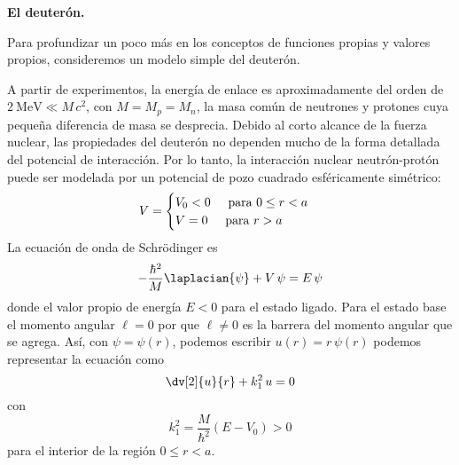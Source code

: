 \begin{ejemplo}{\textbf{El deuterón.}}
    
Para profundizar un poco más en los conceptos de funciones propias y valores propios, consideremos un modelo simple del deuterón.
\par
A partir de experimentos, la energía de enlace es aproximadamente del orden de $\SI{2}{\mega \electronvolt} \ll M \, c^{2} $, con $M = M_{p} = M_{n}$, la masa común de neutrones y protones cuya pequeña diferencia de masa se desprecia. Debido al corto alcance de la fuerza nuclear, las propiedades del deuterón no dependen mucho de la forma detallada del potencial de interacción. Por lo tanto, la interacción nuclear neutrón-protón puede ser modelada por un potencial de pozo cuadrado esféricamente simétrico: 
\begin{equation}
V = \begin{cases}
V_{0} < 0 \hspace{0.5cm} \text{para } 0 \leq r < a \\
V = 0 \hspace{0.5cm} \text{para } r > a
\end{cases}
\end{equation}
La ecuación de onda de Schrödinger es
\begin{equation}
- \dfrac{\hbar^{2}}{M} \laplacian{\psi} + V \, \psi =  E \, \psi
\label{eq:ecuacion_10_10}
\end{equation}
donde el valor propio de energía $E < 0$ para el estado ligado. Para el estado base el momento angular $ \ell = 0$ por que $\ell \neq 0$ es la barrera del momento angular que se agrega. Así, con $\psi =  \psi(r)$, podemos escribir $u(r) = r \, \psi (r)$ podemos representar la ecuación como
\begin{equation}
\dv[2]{u}{r} + k_{1}^{2} \, u = 0
\label{eq:ecuacion_10_11}
\end{equation}
con
\begin{equation}
k_{1}^{2} =  \dfrac{M}{\hbar^{2}} (E - V_{0}) > 0
\label{eq:ecuacion_10_12}
\end{equation}
para el interior de la región $0 \leq r < a$. %

\end{ejemplo}

